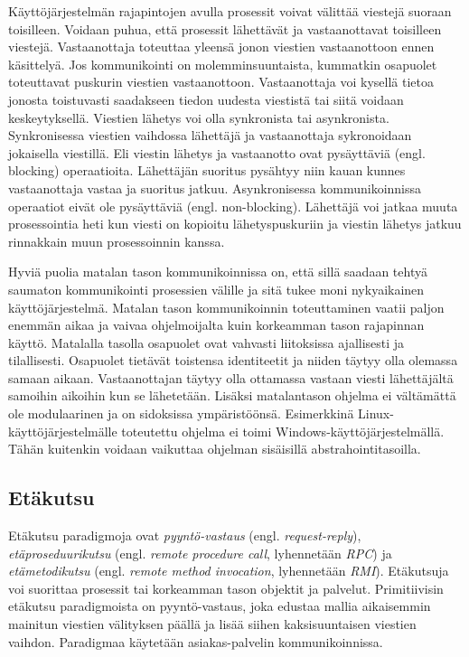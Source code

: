 Käyttöjärjestelmän rajapintojen avulla prosessit voivat välittää viestejä suoraan toisilleen. Voidaan puhua, että prosessit lähettävät ja vastaanottavat toisilleen viestejä. Vastaanottaja toteuttaa yleensä jonon viestien vastaanottoon ennen käsittelyä. Jos kommunikointi on molemminsuuntaista, kummatkin osapuolet toteuttavat puskurin viestien vastaanottoon. Vastaanottaja voi kysellä tietoa jonosta toistuvasti saadakseen tiedon uudesta viestistä tai siitä voidaan keskeytyksellä. Viestien lähetys voi olla synkronista tai asynkronista. Synkronisessa viestien vaihdossa lähettäjä ja vastaanottaja sykronoidaan jokaisella viestillä. Eli viestin lähetys ja vastaanotto ovat pysäyttäviä (engl. blocking) operaatioita. Lähettäjän suoritus pysähtyy niin kauan kunnes vastaanottaja vastaa ja suoritus jatkuu. Asynkronisessa kommunikoinnissa operaatiot eivät ole pysäyttäviä (engl. non-blocking). Lähettäjä voi jatkaa muuta prosessointia heti kun viesti on kopioitu lähetyspuskuriin ja viestin lähetys jatkuu rinnakkain muun prosessoinnin kanssa. \mbox{\cite[s.~147--148]{distributed-systems-concepts-and-design}}

Hyviä puolia matalan tason kommunikoinnissa on, että sillä saadaan tehtyä saumaton kommunikointi prosessien välille ja sitä tukee moni nykyaikainen käyttöjärjestelmä. Matalan tason kommunikoinnin toteuttaminen vaatii paljon enemmän aikaa ja vaivaa ohjelmoijalta kuin korkeamman tason rajapinnan käyttö. Matalalla tasolla osapuolet ovat vahvasti liitoksissa ajallisesti ja tilallisesti. Osapuolet tietävät toistensa identiteetit ja niiden täytyy olla olemassa samaan aikaan. Vastaanottajan täytyy olla ottamassa vastaan viesti lähettäjältä samoihin aikoihin kun se lähetetään. Lisäksi matalantason ohjelma ei vältämättä ole modulaarinen ja on sidoksissa ympäristöönsä. Esimerkkinä Linux-käyt\-tö\-jär\-jes\-tel\-mäl\-le toteutettu ohjelma ei toimi Windows-käyttöjärjestelmällä. Tähän kuitenkin voidaan vaikuttaa ohjelman sisäisillä abstrahointitasoilla.


\subsection{Etäkutsu}
\label{ch:remote-invocation}
Etäkutsu paradigmoja ovat \emph{pyyntö-vastaus} (engl. \emph{request-reply}), \emph{etäproseduurikutsu} (engl. \emph{remote procedure call}, lyhennetään \emph{RPC}) ja \emph{etämetodikutsu} (engl. \emph{remote method invocation}, lyhennetään \emph{RMI}). Etäkutsuja voi suorittaa prosessit tai korkeamman tason objektit ja palvelut. Primitiivisin etäkutsu paradigmoista on pyyntö-vastaus, joka edustaa mallia aikaisemmin mainitun viestien välityksen päällä ja lisää siihen kaksisuuntaisen viestien vaihdon. Paradigmaa käytetään asiakas-palvelin kommunikoinnissa. \mbox{\cite[s.~185--186]{distributed-systems-concepts-and-design}}

